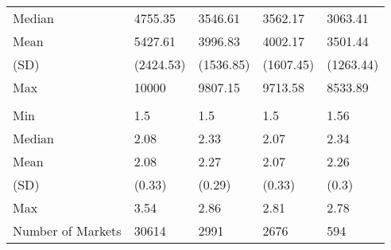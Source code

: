 \begin{tabular}[t]{lllll}
\hspace{1em}Median & 4755.35 & 3546.61 & 3562.17 & 3063.41\\
\hspace{1em}Mean & 5427.61 & 3996.83 & 4002.17 & 3501.44\\
\hspace{1em}(SD) & (2424.53) & (1536.85) & (1607.45) & (1263.44)\\
\hspace{1em}Max & 10000 & 9807.15 & 9713.58 & 8533.89\\
\addlinespace[0.3em]
\multicolumn{5}{l}{\textbf{Market Minimum Distance}}\\
\hspace{1em}Min & 1.5 & 1.5 & 1.5 & 1.56\\
\hspace{1em}Median & 2.08 & 2.33 & 2.07 & 2.34\\
\hspace{1em}Mean & 2.08 & 2.27 & 2.07 & 2.26\\
\hspace{1em}(SD) & (0.33) & (0.29) & (0.33) & (0.3)\\
\hspace{1em}Max & 3.54 & 2.86 & 2.81 & 2.78\\
\midrule
Number of Markets & 30614 & 2991 & 2676 & 594\\
\bottomrule
\end{tabular}
